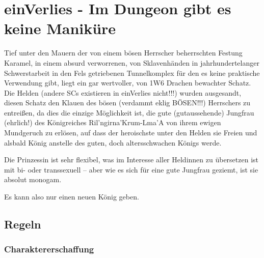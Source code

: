 
\section{einVerlies - Im Dungeon gibt es keine Maniküre}
\label{sect:einVerlies}
Tief unter den Mauern der von einem bösen Herrscher beherrschten Festung Karamel, in einem absurd verworrenen, von Sklavenhänden in jahrhundertelanger Schwerstarbeit in den Fels getriebenen Tunnelkomplex für den es keine praktische Verwendung gibt, liegt ein gar wertvoller, von 1W6 Drachen bewachter Schatz. Die Helden (andere SCs existieren in einVerlies nicht!!!) wurden ausgesandt, diesen Schatz den Klauen des bösen (verdammt eklig BÖSEN!!!) Herrschers zu entreißen, da dies die einzige Möglichkeit ist, die gute (gutaussehende) Jungfrau (ehrlich!) des Königreiches Ril'ngirna'Krum-Lma'A von ihrem ewigen Mundgeruch zu erlösen, auf dass der heroischste unter den Helden sie Freien und alsbald König anstelle des guten, doch altersschwachen Königs werde.

Die Prinzessin ist sehr flexibel, was im Interesse aller Heldinnen zu übersetzen ist mit bi- oder transsexuell -- aber wie es sich für eine gute Jungfrau geziemt, ist sie absolut monogam.

Es kann also nur einen neuen König geben.

 

\subsection{Regeln}

\subsubsection{Charaktererschaffung}

